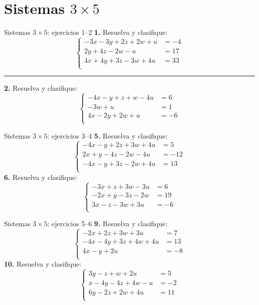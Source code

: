\documentclass[aspectratio=169,9pt]{beamer}
\theoremstyle{remark}
\begin{document}
\section{Sistemas $3\times 5$}
\begin{frame}{Sistemas $3\times 5$: ejercicios 1--2}
\scriptsize
\textbf{1.} Resuelva y clasifique:
\[\left\{\begin{aligned}
-3x-3y+2z+2w+u&=-4\\
2y+4z-2w-u&=17\\
4x+4y+3z-3w+4u&=33\\
\end{aligned}\right.\]
\vspace{0.2em}\hrule\vspace{0.3em}
\textbf{2.} Resuelva y clasifique:
\[\left\{\begin{aligned}
-4x-y+z+w-4u&=6\\
-3w+u&=1\\
4x-2y+2w+u&=-6\\
\end{aligned}\right.\]
\end{frame}
\begin{frame}{Sistemas $3\times 5$: ejercicios 3--4}
\scriptsize
\textbf{5.} Resuelva y clasifique:
\[\left\{\begin{aligned}
-4x-y+2z+3w+4u&=5\\
2x+y-4z-2w-4u&=-12\\
-4x-y+3z-2w+4u&=13\\
\end{aligned}\right.\]
\textbf{6.} Resuelva y clasifique:
\[\left\{\begin{aligned}
-3x+z+3w-3u&=6\\
-2x+y-3z-2w&=19\\
3x-z-3w+3u&=-6\\
\end{aligned}\right.\]
\end{frame}
\begin{frame}{Sistemas $3\times 5$: ejercicios 5--6}
\scriptsize
\textbf{9.} Resuelva y clasifique:
\[\left\{\begin{aligned}
-2x+2z+3w+3u&=7\\
-4x-4y+3z+4w+4u&=13\\
4x-y+2u&=-8\\
\end{aligned}\right.\]
\textbf{10.} Resuelva y clasifique:
\[\left\{\begin{aligned}
3y-z+w+2u&=5\\
x-4y-4z+4w-u&=-2\\
6y-2z+2w+4u&=11\\
\end{aligned}\right.\]
\end{frame}
\end{document}
